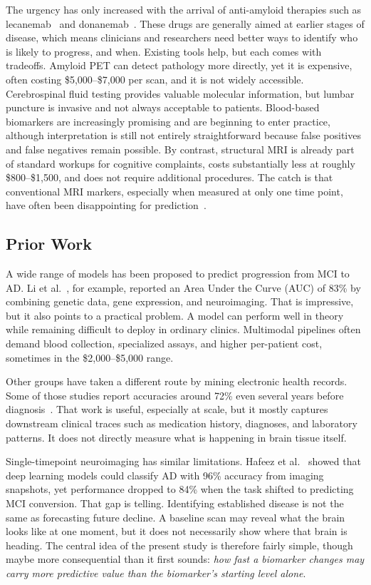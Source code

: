 \documentclass[blue]{ludusofficial}  %
\begin{document}
The urgency has only increased with the arrival of anti-amyloid therapies such as lecanemab~\cite{vanDyck2022lecanemab} and donanemab~\cite{sims2023donanemab}. These drugs are generally aimed at earlier stages of disease, which means clinicians and researchers need better ways to identify who is likely to progress, and when. Existing tools help, but each comes with tradeoffs. Amyloid PET can detect pathology more directly, yet it is expensive, often costing \$5,000--\$7,000 per scan, and it is not widely accessible. Cerebrospinal fluid testing provides valuable molecular information, but lumbar puncture is invasive and not always acceptable to patients. Blood-based biomarkers are increasingly promising and are beginning to enter practice, although interpretation is still not entirely straightforward because false positives and false negatives remain possible. By contrast, structural MRI is already part of standard workups for cognitive complaints, costs substantially less at roughly \$800--\$1,500, and does not require additional procedures. The catch is that conventional MRI markers, especially when measured at only one time point, have often been disappointing for prediction~\cite{baytas2024predicting}.

\subsection{Prior Work}

A wide range of models has been proposed to predict progression from MCI to AD. Li et al.~\cite{li2021predicting}, for example, reported an Area Under the Curve (AUC) of 83\% by combining genetic data, gene expression, and neuroimaging. That is impressive, but it also points to a practical problem. A model can perform well in theory while remaining difficult to deploy in ordinary clinics. Multimodal pipelines often demand blood collection, specialized assays, and higher per-patient cost, sometimes in the \$2,000--\$5,000 range.

Other groups have taken a different route by mining electronic health records. Some of those studies report accuracies around 72\% even several years before diagnosis~\cite{north2025breakthroughs}. That work is useful, especially at scale, but it mostly captures downstream clinical traces such as medication history, diagnoses, and laboratory patterns. It does not directly measure what is happening in brain tissue itself.

Single-timepoint neuroimaging has similar limitations. Hafeez et al.~\cite{hafeez2024deep} showed that deep learning models could classify AD with 96\% accuracy from imaging snapshots, yet performance dropped to 84\% when the task shifted to predicting MCI conversion. That gap is telling. Identifying established disease is not the same as forecasting future decline. A baseline scan may reveal what the brain looks like at one moment, but it does not necessarily show where that brain is heading. The central idea of the present study is therefore fairly simple, though maybe more consequential than it first sounds: \textit{how fast a biomarker changes may carry more predictive value than the biomarker's starting level alone}.
\end{document}
